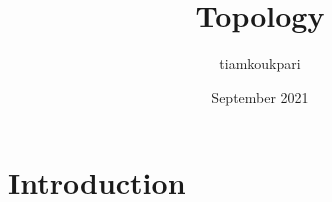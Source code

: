 \documentclass{article}
\title{Topology}
\author{tiamkoukpari }
\date{September 2021}
\begin{document}
\maketitle

\section{Introduction}
\end{document}
